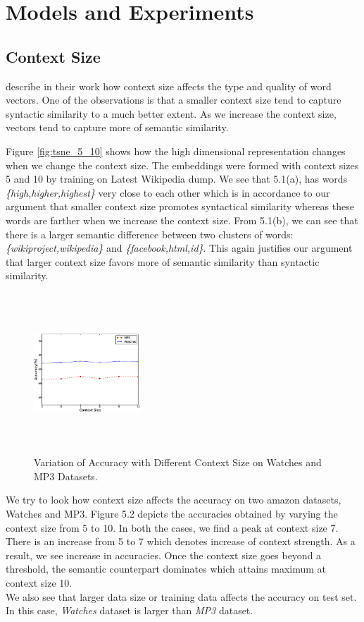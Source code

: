 \documentclass[11pt,a4paper]{article}
\begin{document}
\section{Models and Experiments}
\label{sec:experiment}
\subsection{Context Size}
\cite{Mikolov:13a} describe in their work how context size affects the type and quality of word vectors. One of the observations is that a smaller context size tend to capture syntactic similarity to a much better extent. As we increase the context size, vectors tend to capture more of semantic similarity.

Figure \ref{fig:tsne_5_10} shows how the high dimensional representation changes when we change the context size. The embeddings were formed with context sizes 5 and 10 by training on Latest Wikipedia dump. We see that 5.1(a), has words \emph{\{high,higher,highest\}} very close to each other which is in accordance to our argument that smaller context size promotes syntactical similarity whereas these words are farther when we increase the context size. From 5.1(b), we can see that there is a larger semantic difference between two clusters of words:\emph{\{wikiproject,wikipedia\}} and \emph{\{facebook,html,id\}}. This again justifies our argument that larger context size favors more of semantic similarity than syntactic similarity.

\begin{figure}[ht!]
\centering
\includegraphics[width=40mm, height=60mm]{img/context_size.eps}
\caption{Variation of Accuracy with Different Context Size on Watches and MP3 Datasets. \label{fig:context_size}}
\end{figure}
We try to look how context size affects the accuracy on two amazon datasets, Watches and MP3.
Figure 5.2 depicts the accuracies obtained by varying the context size from 5 to 10. In both the cases, we find a peak at context size 7. There is an increase from 5 to 7 which denotes increase of context strength. As a result, we see increase in accuracies. Once the context size goes beyond a threshold, the semantic counterpart dominates which attains maximum at context size 10.\\
We also see that larger data size or training data affects the accuracy on test set. In this case, \emph{Watches} dataset is larger than \emph{MP3} dataset.\\
\end{document}
